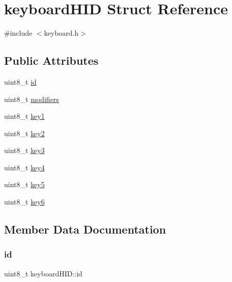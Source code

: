 \hypertarget{structkeyboardHID}{}\section{keyboard\+H\+ID Struct Reference}
\label{structkeyboardHID}


{\ttfamily \#include $<$keyboard.\+h$>$}

\subsection*{Public Attributes}
\begin{DoxyCompactItemize}
\item 
uint8\+\_\+t \hyperlink{structkeyboardHID_a34586b90d93b4adbf21bc2a6a5768719}{id}
\item 
uint8\+\_\+t \hyperlink{structkeyboardHID_af9b16f0982275eddfa430dd71fa64825}{modifiers}
\item 
uint8\+\_\+t \hyperlink{structkeyboardHID_a8d13499cb3958bd1513324ecfcc3cea2}{key1}
\item 
uint8\+\_\+t \hyperlink{structkeyboardHID_a32322c276df068828637c99ef9cf7efc}{key2}
\item 
uint8\+\_\+t \hyperlink{structkeyboardHID_a3f5f492cd68dc9ed37c0d5c105efa5c4}{key3}
\item 
uint8\+\_\+t \hyperlink{structkeyboardHID_a92ceb9b21b10f5cb65e70ae2a689b2f3}{key4}
\item 
uint8\+\_\+t \hyperlink{structkeyboardHID_ab11bee72b1b28da4b8f0dec2c834a4db}{key5}
\item 
uint8\+\_\+t \hyperlink{structkeyboardHID_a47cb0263b63064de604d637f844af705}{key6}
\end{DoxyCompactItemize}


\subsection{Member Data Documentation}
\mbox{\label{structkeyboardHID_a34586b90d93b4adbf21bc2a6a5768719}} 
\subsubsection{\texorpdfstring{id}{id}}
{\footnotesize\ttfamily uint8\+\_\+t keyboard\+H\+I\+D\+::id}

\mbox{\label{structkeyboardHID_a8d13499cb3958bd1513324ecfcc3cea2}} 
